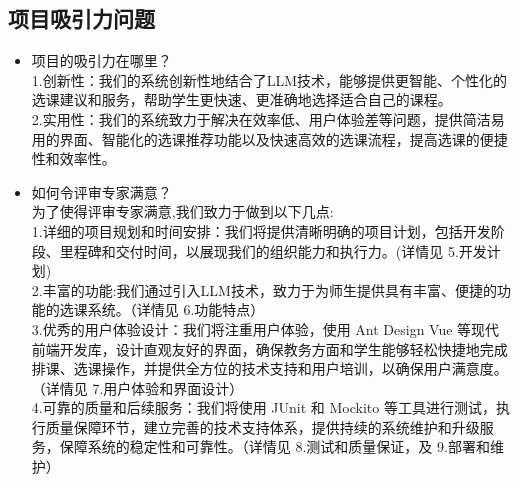 \documentclass{article}
\begin{document}
\subsection{项目吸引力问题}
\begin{itemize}
	\item 项目的吸引力在哪里？\\
	1.创新性：我们的系统创新性地结合了LLM技术，能够提供更智能、个性化的选课建议和服务，帮助学生更快速、更准确地选择适合自己的课程。\\
	2.实用性：我们的系统致力于解决在效率低、用户体验差等问题，提供简洁易用的界面、智能化的选课推荐功能以及快速高效的选课流程，提高选课的便捷性和效率性。\\
	\item 如何令评审专家满意？\\
	为了使得评审专家满意,我们致力于做到以下几点:\\
	1.详细的项目规划和时间安排：我们将提供清晰明确的项目计划，包括开发阶段、里程碑和交付时间，以展现我们的组织能力和执行力。(详情见 5.开发计划)\\
	2.丰富的功能:我们通过引入LLM技术，致力于为师生提供具有丰富、便捷的功能的选课系统。（详情见 6.功能特点）\\
	3.优秀的用户体验设计：我们将注重用户体验，使用 Ant Design Vue 等现代前端开发库，设计直观友好的界面，确保教务方面和学生能够轻松快捷地完成排课、选课操作，并提供全方位的技术支持和用户培训，以确保用户满意度。（详情见 7.用户体验和界面设计）\\
	4.可靠的质量和后续服务：我们将使用 JUnit 和 Mockito 等工具进行测试，执行质量保障环节，建立完善的技术支持体系，提供持续的系统维护和升级服务，保障系统的稳定性和可靠性。（详情见 8.测试和质量保证，及 9.部署和维护）\\
\end{itemize}
\end{document}
